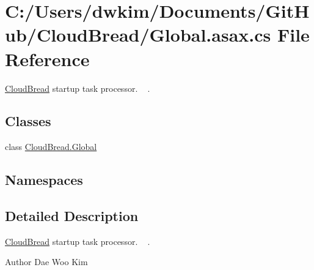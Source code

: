 \hypertarget{a00167}{}\section{C\+:/\+Users/dwkim/\+Documents/\+Git\+Hub/\+Cloud\+Bread/\+Global.asax.\+cs File Reference}
\label{a00167}


\hyperlink{a00217}{Cloud\+Bread} startup task processor. ~\newline
.  


\subsection*{Classes}
\begin{DoxyCompactItemize}
\item 
class \hyperlink{a00075}{Cloud\+Bread.\+Global}
\end{DoxyCompactItemize}
\subsection*{Namespaces}
\begin{DoxyCompactItemize}
\end{DoxyCompactItemize}


\subsection{Detailed Description}
\hyperlink{a00217}{Cloud\+Bread} startup task processor. ~\newline
. 

\begin{DoxyAuthor}{Author}
Dae Woo Kim 
\end{DoxyAuthor}
